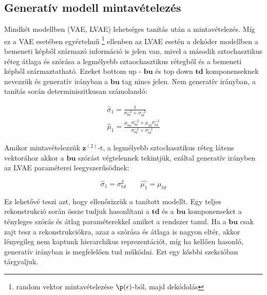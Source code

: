 \documentclass[12pt, english]{article}
\begin{document}
\vspace{5mm}

\subsection{Generatív modell mintavételezés}

\vspace{5mm}

\par Mindkét modellben (VAE, LVAE) lehetséges tanítás után a mintavételezés. Míg ez a VAE esetében egyértelmű \footnote{random vektor mintavételezése $\p(\epsilon)$-ból, majd dekódolás} ellenben az LVAE esetén a dekóder modellben a bemeneti képből származó információ is jelen van, mivel a második sztochasztikus réteg átlaga és szórása a legmélyebb sztaochasztikus rétegből és a bemeneti képből származtatható. Ezeket bottom up - $\bm{bu}$ és top down $\bm{td}$ komponenseknek nevezzük és generatív irányban a $\bm{bu}$ tag nincs jelen. Nem generatív irányban, a tanítás során determiniszitkusan számolandó:

\vspace{4mm}

\begin{gather}
    \label{eq:z1-mean-sigma-1}
    \hat{\sigma}_{1} = \frac{1}{\sigma_{bu}^{-2} + \sigma_{td}^{-2}} \\
    \hat{\mu}_{1} = \frac{\mu_{bu}\sigma_{bu}^{-2} + \mu_{td}\sigma_{td}^{-2}}{\sigma_{bu}^{-2} + \sigma_{td}^{-2}}
    \label{eq:z1-mean-sigma-2}
\end{gather}

\vspace{4mm}

\par Amikor mintavételezzük $\bm{z}^{(2)}$-t, a legmélyebb sztochasztikus réteg látens vektorához akkor a $\bm{bu}$ szórást végtelennek tekintjük, ezáltal generatív irányben az LVAE paraméterei leegyszerűsödnek:

\vspace{4mm}

\begin{equation}
    \hat{\sigma}_{1} = \sigma_{td}^{2} \quad \quad \hat{\mu_{1}} = \mu_{td}
    \label{eq:ladder-vae-sampling}
\end{equation}

\vspace{4mm}

\par Ez lehetővé teszi azt, hogy ellenőrizzük a tanított modellt. Egy teljes rekonstrukció során össze tudjuk hasonlítani a $\bm{td}$ és a $\bm{bu}$ komponenseket a tényleges szórás és átlag paraméterekkel amiket a rendszer tanul. Ha a $\bm{bu}$ csak zajt tesz a rekonstrukciókra, azaz a szórása és átlaga is nagyon eltér, akkor lényegileg nem kaptunk hierarchikus reprezentációt, míg ha kellően hasonló, generatív irányban is megfelelően tud működni. Ezt egy kősbbi szekcióban tárgyaljuk.
\end{document}
